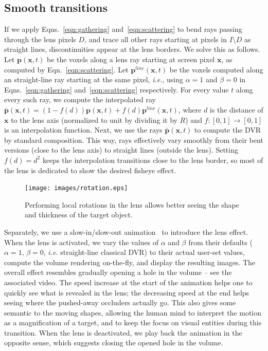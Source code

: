 \subsection{Smooth transitions}
\label{continuity}
%
If we apply Eqns.~\ref{eqn:gathering} and~\ref{eqn:scattering} to bend rays passing through the lens pixels $D$, and trace all other rays starting at pixels in $I \setminus D$ as straight lines, discontinuities appear at the lens borders. We solve this as follows. Let $\mathbf{p}(\mathbf{x},t)$ be the voxels along a lens ray starting at screen pixel $\mathbf{x}$, as computed by Eqn.~\ref{eqn:scattering}. Let $\mathbf{p}^{line}(\mathbf{x},t)$ be the voxels computed along an straight-line ray starting at the same pixel, \emph{i.e.}, using $\alpha=1$ and $\beta=0$ in Eqns.~\ref{eqn:gathering} and~\ref{eqn:scattering} respectively. For every value $t$ along every such ray, we compute the interpolated ray
$\bar{\mathbf{p}}(\mathbf{x},t) = (1-f(d))\mathbf{p}(\mathbf{x},t) + f(d)\mathbf{p}^{line}(\mathbf{x},t)$, where $d$ is the distance of $\mathbf{x}$ to the lens axis (normalized to unit by dividing it by $R$) and $f : [0,1] \rightarrow [0,1]$ is an interpolation function. Next, we use the rays $\bar{\mathbf{p}}(\mathbf{x},t)$ to compute the DVR by standard composition. This way, rays effectively vary smoothly from their bent versions (close to the lens axis) to straight lines (outside the lens). Setting $f(d) = d^2$ keeps the interpolation transitions close to the lens border, so most of the lens is dedicated to show the desired fisheye effect.


\begin{figure}[htbp!]
\centering
\texttt{[image: images/rotation.eps]}
\vspace{-0.15cm}
\caption{Performing local rotations in the lens allows better seeing the shape and thickness of the target object.}
\label{f:rotation}
\vspace{-0.15cm}
\end{figure}



Separately, we use a slow-in/slow-out animation~\cite{Dragicevic:2011:TDA:1978942.1979233} to introduce the lens effect. When the lens is activated, we vary the values of $\alpha$ and $\beta$ from their defaults ($\alpha=1$, $\beta=0$, \emph{i.e.} straight-line classical DVR) to their actual user-set values, compute the volume rendering on-the-fly, and display the resulting images. The overall effect resembles gradually opening a hole in the volume -- see the associated video. The speed increase at the start of the animation helps one to quickly see what is revealed in the lens; the decreasing speed at the end helps seeing where the pushed-away occluders actually go. This also gives some semantic to the moving shapes, allowing the human mind to interpret the motion as a magnification of a target, and to keep the focus on visual entities during this transition. When the lens is deactivated, we play back the animation in the opposite sense, which suggests closing the opened hole in the volume.

